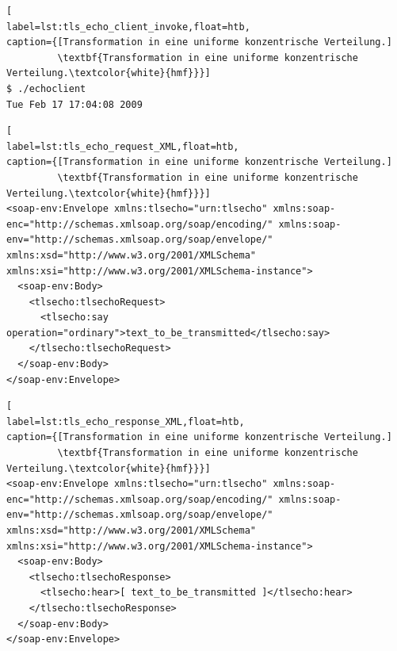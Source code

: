 \begin{lstlisting}[
label=lst:tls_echo_client_invoke,float=htb,
caption={[Transformation in eine uniforme konzentrische Verteilung.]
         \textbf{Transformation in eine uniforme konzentrische Verteilung.\textcolor{white}{hmf}}}]
$ ./echoclient
Tue Feb 17 17:04:08 2009
\end{lstlisting}






\begin{lstlisting}[
label=lst:tls_echo_request_XML,float=htb,
caption={[Transformation in eine uniforme konzentrische Verteilung.]
         \textbf{Transformation in eine uniforme konzentrische Verteilung.\textcolor{white}{hmf}}}]
<soap-env:Envelope xmlns:tlsecho="urn:tlsecho" xmlns:soap-enc="http://schemas.xmlsoap.org/soap/encoding/" xmlns:soap-env="http://schemas.xmlsoap.org/soap/envelope/" xmlns:xsd="http://www.w3.org/2001/XMLSchema" xmlns:xsi="http://www.w3.org/2001/XMLSchema-instance">
  <soap-env:Body>
    <tlsecho:tlsechoRequest>
      <tlsecho:say operation="ordinary">text_to_be_transmitted</tlsecho:say>
    </tlsecho:tlsechoRequest>
  </soap-env:Body>
</soap-env:Envelope>
\end{lstlisting}






\begin{lstlisting}[
label=lst:tls_echo_response_XML,float=htb,
caption={[Transformation in eine uniforme konzentrische Verteilung.]
         \textbf{Transformation in eine uniforme konzentrische Verteilung.\textcolor{white}{hmf}}}]
<soap-env:Envelope xmlns:tlsecho="urn:tlsecho" xmlns:soap-enc="http://schemas.xmlsoap.org/soap/encoding/" xmlns:soap-env="http://schemas.xmlsoap.org/soap/envelope/" xmlns:xsd="http://www.w3.org/2001/XMLSchema" xmlns:xsi="http://www.w3.org/2001/XMLSchema-instance">
  <soap-env:Body>
    <tlsecho:tlsechoResponse>
      <tlsecho:hear>[ text_to_be_transmitted ]</tlsecho:hear>
    </tlsecho:tlsechoResponse>
  </soap-env:Body>
</soap-env:Envelope>
\end{lstlisting}

